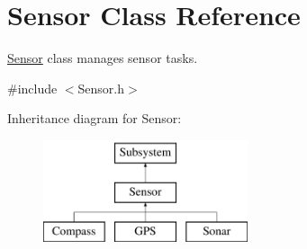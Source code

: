 \hypertarget{classSensor}{\section{Sensor Class Reference}
\label{classSensor}
}


\hyperlink{classSensor}{Sensor} class manages sensor tasks.  




{\ttfamily \#include $<$Sensor.\-h$>$}

Inheritance diagram for Sensor\-:\begin{figure}[H]
\begin{center}
\leavevmode
\includegraphics[height=3.000000cm]{classSensor}
\end{center}
\end{figure}
